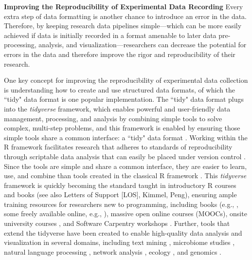 \documentclass[pdftex,english,11pt,parskip=half]{scrartcl}
\begin{document}
\textbf{Improving the Reproducibility of Experimental Data Recording} Every extra step of data formatting is another chance to introduce an error in the data. Therefore, by keeping research data pipelines simple---which can be more easily achieved if data is initially recorded in a format amenable to later data pre-processing, analysis, and visualization---researchers can decrease the potential for errors in the data and therefore improve the rigor and reproducibility of their research.

One key concept for improving the reproducibility of experimental data collection is understanding how to create and use structured data formats, of which the ``tidy" data format is one popular implementation. The ``tidy" data format plugs into the \textit{tidyverse} framework, which enables powerful and user-friendly data management, processing, and analysis by combining simple tools to solve complex, multi-step problems, and this framework is enabled by ensuring those simple tools share a common interface: a ``tidy" data format \cite{ross2017declutter, silge2016tidytext, wickham2016ggplot2, wickham2016r}. Working within the R framework facilitates research that adheres to standards of reproducibility through scriptable data analysis that can easily be placed under version control \cite{bryan2017excuse}. Since the tools are simple and share a common interface, they are easier to learn, use, and combine than tools created in the classical R framework \cite{ross2017declutter, lowndes2017our, reviewer2017review, mcnamara2016state}. This \textit{tidyverse} framework is quickly becoming the standard taught in introductory R courses and books \cite{hicks2017guide, baumer2015data, kaplan2017teaching, stander2017enthusing, reviewer2017review, mcnamara2016state} (see also Letters of Support [LOS], Kimmel, Peng), ensuring ample training resources for researchers new to programming, including books (e.g., \cite{baumer2017modern, lifesciencesR}, some freely available online, e.g., \cite{wickham2016r}), massive open online courses (MOOCs), onsite university courses \cite{baumer2015data, kaplan2017teaching, stander2017enthusing}, and Software Carpentry workshops \cite{wilson2014software, pawlik2017developing}. Further, tools that extend the tidyverse have been created to enable high-quality data analysis and visualization in several domains, including text mining \cite{silge2017text}, microbiome studies \cite{mcmurdie2013phyloseq}, natural language processing \cite{RJ-2017-035}, network analysis \cite{RJ-2017-023}, ecology \cite{hsieh2016inext}, and genomics \cite{yin2012ggbio}.
\end{document}
